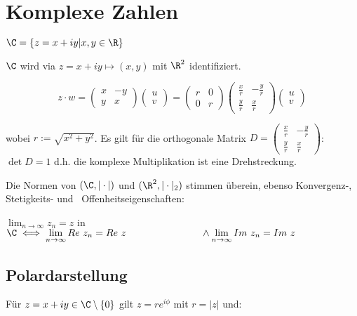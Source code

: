 \section*{Komplexe Zahlen}

\(\C = \{ z = x+iy | x,y \in \R \}\)

	\(\C\) wird via \(z = x + iy \mapsto (x,y)\) mit \(\R^2\) identifiziert.

\vspace*{-4mm}
\[ z \cdot w = \begin{pmatrix} x & -y \\ y & x\end{pmatrix} \begin{pmatrix} u \\ v\end{pmatrix} = \begin{pmatrix} r & 0 \\ 0 & r\end{pmatrix} \begin{pmatrix} \frac{x}{r} & -\frac{y}{r} \\ \frac{y}{r} & \frac{x}{r}\end{pmatrix} \begin{pmatrix} u \\ v\end{pmatrix} \]

wobei \(r := \sqrt{x^2 + y^2}\). Es gilt für die orthogonale Matrix \(D = \begin{pmatrix} \frac{x}{r} & -\frac{y}{r} \\ \frac{y}{r} & \frac{x}{r}\end{pmatrix}\): \(\det D = 1\) d.h. die komplexe Multiplikation ist eine Drehstreckung.

\vspace*{1mm}

Die Normen von \((\C,|\cdot|)\) und \((\R^2,|\cdot|_2)\) stimmen überein, ebenso Konvergenz-, Stetigkeits- und \ Offenheitseigenschaften:

\spacing
\(\displaystyle\lim_{n \to \infty} z_n = z\) in \(\C \iff \displaystyle\lim_{n \to \infty} Re \ z_n = Re \ z \\ \hspace*{26.8mm} \land \lim_{n \to \infty} Im \ z_n = Im \ z\)

\subsection*{Polardarstellung}

Für \(z = x +iy \in \C \setminus \{0\}\) gilt \(z = re^{i\phi}\) mit \(r = |z|\) und:

